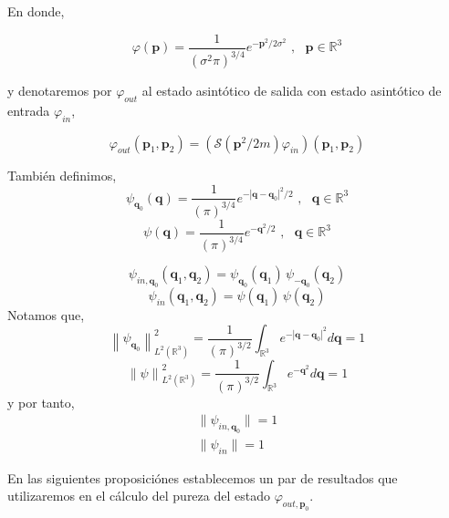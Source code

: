 \documentclass[12pt]{book}
\numberwithin{equation}{chapter}
\def\v{\mathbf}
\def\R{\mathbb{R}}
\def\vp{\varphi}
\def\P{\mathbf{p}}
\begin{document}
En donde,

\begin{equation}\label{estinp01}
\vp(\P)= \frac{1}{(\sigma^{2} \pi)^{3/4}} e^{-\P^{2}/2\sigma^{2} } \,\,,\,\,\,\, \P \in \R^{3}
\end{equation}

y denotaremos por $\vp_{out}$ al estado asint\'otico de salida con estado asint\'otico de entrada $\vp_{in}$,

\begin{equation}\label{estoutp0}
\vp_{out}(\P_{1},\P_{2})= ( \mathcal{S}(\P^{2}/2m) \vp_{in} ) (\P_{1},\P_{2})
\end{equation}

Tambi\'en definimos,
\begin{equation}
\psi_{\v{q}_{0}}(\v{q})=\frac{1}{(\pi)^{3/4}}e^{-|\v{q}-\v{q}_{0}|^{2}/2}\,\,,\,\,\,\, \v{q} \in \R^{3}
\end{equation}
\begin{equation}\label{psi}
\psi(\v{q})=\frac{1}{(\pi)^{3/4}}e^{-\v{q}^{2}/2}\,\,,\,\,\,\, \v{q} \in \R^{3}
\end{equation}

\begin{equation}
\psi_{in,\v{q}_{0}}(\v{q}_{1},\v{q}_{2})=\psi_{\v{q}_{0}}(\v{q}_{1})\,\psi_{-\v{q}_{0}}(\v{q}_{2})
\end{equation}
\begin{equation}\label{psi-est}
\psi_{in}(\v{q}_{1},\v{q}_{2})=\psi(\v{q}_{1})\,\psi(\v{q}_{2})
\end{equation}
Notamos que,
\begin{equation}
\left\| \psi_{\v{q}_{0}} \right\|_{L^{2}(\R^{3})}^{2}= \frac{1}{(\pi)^{3/2}} \int_{\R^{3}} e^{-|\v{q}-\v{q}_{0}|^{2}} d \v{q}=1
\end{equation}
\begin{equation}
\left\| \psi \right\|_{L^{2}(\R^{3})}^{2}= \frac{1}{(\pi)^{3/2}} \int_{\R^{3}} e^{-\v{q}^{2}} d \v{q}=1
\end{equation}
y por tanto,
\begin{subequations}\label{p1-p2-p-pcm}
\begin{align}\label{norm-psi}
\| \psi_{in,\v{q}_{0}} \|=1\\
\| \psi_{in} \|=1
\end{align}
\end{subequations}


\newpage
En las siguientes proposici\'ones establecemos un par de resultados que utilizaremos en el c\'alculo del pureza del estado $\vp_{out,\P_{0}}$.
\end{document}
